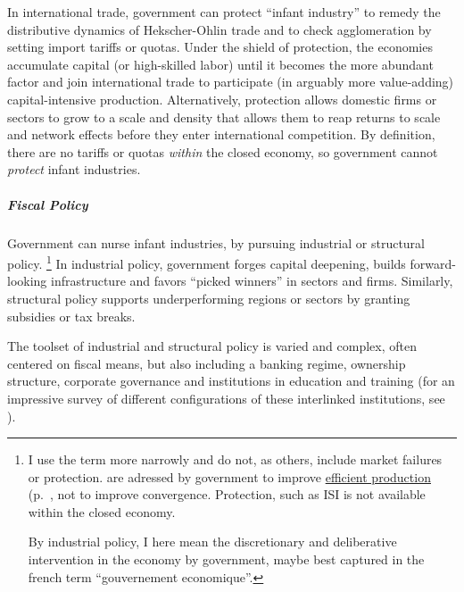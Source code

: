 In international trade, government can protect ``infant industry'' to remedy the distributive dynamics of Hekscher-Ohlin trade and to check agglomeration by setting import tariffs or quotas.
Under the shield of protection, the economies accumulate capital (or high-skilled labor) until it becomes the more abundant factor and join international trade to participate (in arguably more value-adding) capital-intensive production.
Alternatively, protection allows domestic firms or sectors to grow to a scale and density that allows them to reap returns to scale and network effects before they enter international competition.
By definition, there are no tariffs or quotas \emph{within} the closed economy, so government cannot \emph{protect} infant industries.

\subparagraph{Fiscal Policy}
Government can nurse infant industries, by pursuing industrial or structural policy.
\footnote{
	I use the term more narrowly and do not, as others, include market failures or protection.
	 are adressed by government to improve \hyperref[sec:production]{efficient production} (p.~\pageref{sec:production}, not to improve convergence.
	Protection, such as \gls{ISI} is not available within the closed economy.

	By industrial policy, I here mean the discretionary and deliberative intervention in the economy by government, maybe best captured in the french term ``gouvernement economique''.
}
In industrial policy, government forges capital deepening, builds forward-looking infrastructure and favors ``picked winners'' in sectors and firms.
Similarly, structural policy supports underperforming regions or sectors by granting subsidies or tax breaks.

The toolset of industrial and structural policy is varied and complex, often centered on fiscal means, but also including a banking regime, ownership structure, corporate governance and institutions in education and training (for an impressive survey of different configurations of these interlinked institutions, see \citealt{HallSoskice-2001-aa}).

